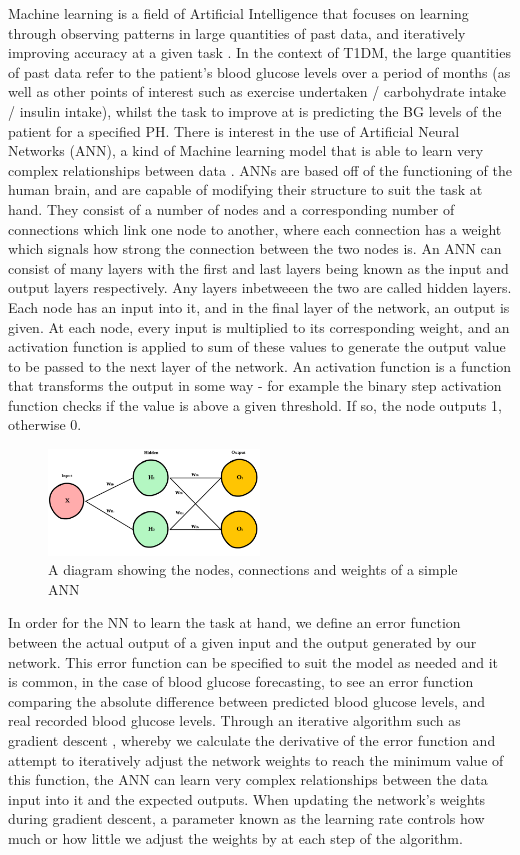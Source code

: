       Machine learning is a field of Artificial Intelligence that focuses on learning through observing patterns in large quantities of past data, and iteratively improving accuracy at a given task \cite{whatisml}. In the context of T1DM, the large quantities of past data refer to the patient's blood glucose levels over a period of months (as well as other points of interest such as exercise undertaken / carbohydrate intake / insulin intake), whilst the task to improve at is predicting the BG levels of the patient for a specified PH. There is interest in the use of Artificial Neural Networks (ANN), a kind of Machine learning model that is able to learn very complex relationships between data \cite{whatisnn}. ANNs are based off of the functioning of the human brain, and are capable of modifying their structure to suit the task at hand. They consist of a number of nodes and a corresponding number of connections which link one node to another, where each connection has a weight which signals how strong the connection between the two nodes is. An ANN can consist of many layers with the first and last layers being known as the input and output layers respectively. Any layers inbetweeen the two are called hidden layers. Each node has an input into it, and in the final layer of the network, an output is given. At each node, every input is multiplied to its corresponding weight, and an activation function is applied to sum of these values to generate the output value to be passed to the next layer of the network. An activation function is a function that transforms the output in some way - for example the binary step activation function checks if the value is above a given threshold. If so, the node outputs 1, otherwise 0.
      \begin{figure}[H]
        \centering
        \includegraphics[width=0.5\textwidth]{images/basicNN.png}
        \caption{
         A diagram showing the nodes, connections and weights of a simple ANN \cite{whatisnnimage}
        }
      \end{figure}
      In order for the NN to learn the task at hand, we define an error function between the actual output of a given input and the output generated by our network. This error function can be specified to suit the model as needed and it is common, in the case of blood glucose forecasting, to see an error function comparing the absolute difference between predicted blood glucose levels, and real recorded blood glucose levels. Through an iterative algorithm such as gradient descent \cite{whatisgd}, whereby we calculate the derivative of the error function and attempt to iteratively adjust the network weights to reach the minimum value of this function, the ANN can learn very complex relationships between the data input into it and the expected outputs. When updating the network's weights during gradient descent, a parameter known as the learning rate controls how much or how little we adjust the weights by at each step of the algorithm.
